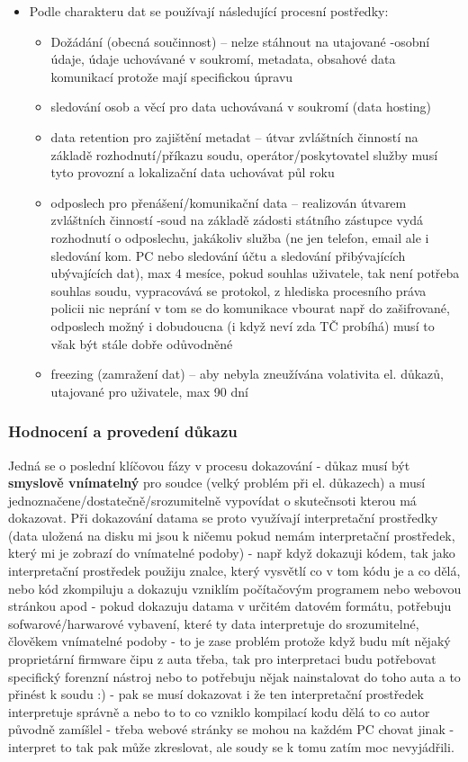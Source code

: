 \begin{itemize}
    \item Podle charakteru dat se používají následující procesní postředky:
        \begin{itemize}
            \item Dožádání (obecná součinnost) -- nelze stáhnout na utajované -osobní údaje, údaje uchovávané v soukromí, metadata, obsahové data komunikací protože mají specifickou úpravu
            \item  sledování osob a věcí pro data uchovávaná v soukromí (data hosting)
            \item data retention pro zajištění metadat -- útvar zvláštních činností na základě rozhodnutí/příkazu soudu, operátor/poskytovatel služby musí tyto provozní a lokalizační data uchovávat půl roku
            \item odposlech pro přenášení/komunikační data -- realizován útvarem zvláštních činností -soud na základě zádosti státního zástupce vydá rozhodnutí o odposlechu, jakákoliv služba (ne jen telefon, email ale i sledování kom. PC nebo sledování účtu a sledování přibývajících ubývajících dat), max 4 mesíce, pokud souhlas uživatele, tak není potřeba souhlas soudu, vypracovává se protokol, z hlediska procesního práva policii nic neprání v tom se do komunikace vbourat např do zašifrované, odposlech možný i dobudoucna (i když neví zda TČ probíhá) musí to však být stále dobře odůvodněné
            \item  freezing (zamražení dat) -- aby nebyla zneužívána volativita el. důkazů, utajované pro uživatele, max 90 dní
        \end{itemize}
\end{itemize}

\subsubsection{Hodnocení a provedení důkazu}
Jedná se o poslední klíčovou fázy v procesu dokazování - důkaz musí být \textbf{smyslově vnímatelný}
pro soudce (velký problém při el. důkazech) a musí jednoznačene/dostatečně/srozumitelně
vypovídat o skutečnsoti kterou má dokazovat. \newline
Při dokazování datama se proto využívají interpretační prostředky (data uložená na disku mi jsou k ničemu pokud nemám interpretační prostředek, který mi je zobrazí do vnímatelné podoby) - např když dokazuji kódem, tak jako
interpretační prostředek použiju znalce, který vysvětlí co v tom kódu je a co dělá, nebo kód
zkompiluju a dokazuju vzniklím počítačovým programem nebo webovou stránkou apod - pokud
dokazuju datama v určitém datovém formátu, potřebuju sofwarové/harwarové vybavení, které ty
data interpretuje do srozumitelné, člověkem vnímatelné podoby - to je zase problém protože když
budu mít nějaký proprietární firmware čipu z auta třeba, tak pro interpretaci budu potřebovat
specifický forenzní nástroj nebo to potřebuju nějak nainstalovat do toho auta a to přinést k soudu
:) - pak se musí dokazovat i že ten interpretační prostředek interpretuje správně a nebo to to co
vzniklo kompilací kodu dělá to co autor původně zamíšlel - třeba webové stránky se mohou na
každém PC chovat jinak - interpret to tak pak může zkreslovat, ale soudy se k tomu zatím moc
nevyjádřili.

